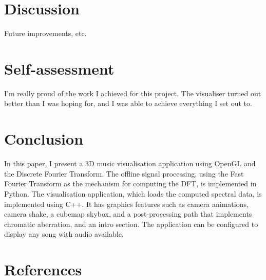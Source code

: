 \documentclass[11pt]{article}
\begin{document}

\section{Discussion}
Future improvements, etc.

\section{Self-assessment}
I'm really proud of the work I achieved for this project. The visualiser turned out better than I was hoping
for, and I was able to achieve everything I set out to.

\section{Conclusion}
In this paper, I present a 3D music visualisation application using OpenGL and the Discrete Fourier
Transform. The offline signal processing, using the Fast Fourier Transform as the mechanism for computing the
DFT, is implemented in Python. The visualisation application, which loads the computed spectral data, is
implemented using C++. It has graphics features such as camera animations, camera shake, a cubemap skybox, and
a post-processing path that implements chromatic aberration, and an intro section. The application can be
configured to display any song with audio available.

\section{References}
\printbibliography[heading=none]
\end{document}
